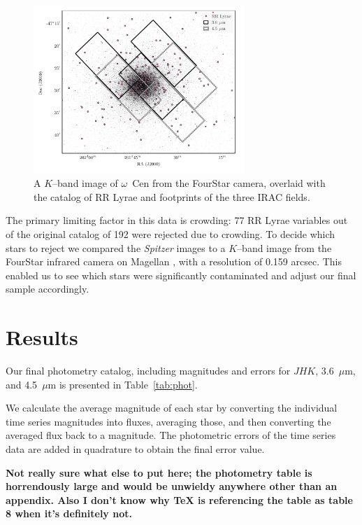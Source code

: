 \documentclass[a4paper,fleqn,usenatbib]{mnras}
\begin{document}
\begin{figure}
\begin{center}
\includegraphics[width=80mm]{final_plots/omegacen_coverage_map.pdf}
\caption{A $K$--band image of $\omega$~Cen from the FourStar camera, overlaid with the catalog of RR Lyrae \citep{2004A&A...424.1101K} and footprints of the three IRAC fields.}
\label{fig:omegaCen_fields}
\end{center}
\end{figure}

The primary limiting factor in this data is crowding: 77 RR Lyrae variables out of the original catalog of 192 \citep{2004A&A...424.1101K} were rejected due to crowding. To decide which stars to reject we compared the {\it Spitzer} images to a $K$--band image from the FourStar infrared camera on Magellan \citep{2013PASP..125..654P}, with a resolution of 0.159 arcsec. This enabled us to see which stars were significantly contaminated and adjust our final sample accordingly. 

\section{Results}

Our final photometry catalog, including magnitudes and errors for $J\!H\!K$, 3.6~$\mu$m, and 4.5~$\mu$m is presented in Table~\ref{tab:phot}.

We calculate the average magnitude of each star by converting the individual time series magnitudes into fluxes, averaging those, and then converting the averaged flux back to a magnitude. The photometric errors of the time series data are added in quadrature to obtain the final error value.

{\bf Not really sure what else to put here; the photometry table is horrendously large and would be unwieldy anywhere other than an appendix. Also I don't know why TeX is referencing the table as table 8 when it's definitely not.}
\end{document}

